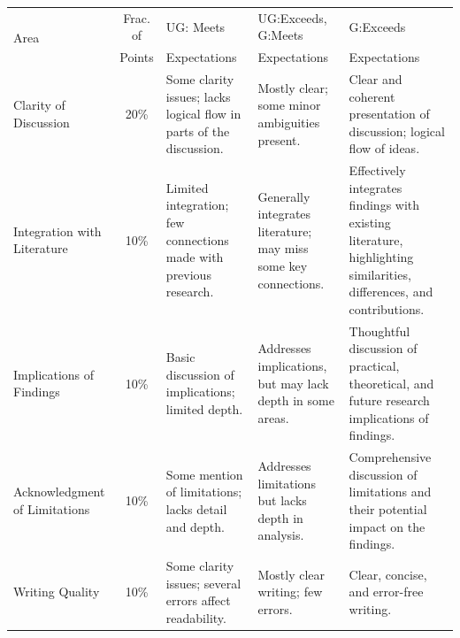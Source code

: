 \documentclass[11pt]{article}
\begin{document}
\begin{landscape}
\begin{table}
    \centering
    \small
    \begin{tabular}{p{.75in} c  p{2.25in}  p{2.25in}  p{2.25in}}
        \multirow{2}{*}{Area}  	& Frac. of   	& UG: Meets		& UG:Exceeds, G:Meets   & G:Exceeds 	  \\
                                & Points & Expectations  & Expectations  		& Expectations \\
        \toprule
        Clarity of Discussion   & 20\%\vspace{.25in} 			& Some clarity issues; lacks logical flow in parts of the discussion. & Mostly clear; some minor ambiguities present. & Clear and coherent presentation of discussion; logical flow of ideas. \\
        \midrule
        Integration with Literature & 10\%\vspace{.25in}		& Limited integration; few connections made with previous research. & Generally integrates literature; may miss some key connections. & Effectively integrates findings with existing literature, highlighting similarities, differences, and contributions. \\
        \midrule
        Implications of Findings & 10\%\vspace{.25in}			& Basic discussion of implications; limited depth. & Addresses implications, but may lack depth in some areas. & Thoughtful discussion of practical, theoretical, and future research implications of findings. \\
        \midrule
        Acknowledgment of Limitations & 10\%\vspace{.25in}	& Some mention of limitations; lacks detail and depth. & Addresses limitations but lacks depth in analysis. & Comprehensive discussion of limitations and their potential impact on the findings. \\
        \midrule
        Writing Quality 		& 10\%\vspace{.25in}			& Some clarity issues; several errors affect readability. & Mostly clear writing; few errors. & Clear, concise, and error-free writing. \\
        \bottomrule
    \end{tabular}
\end{table}
\end{landscape}

\end{document}
